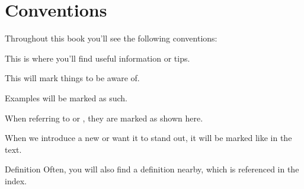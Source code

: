 % 

\section{Conventions}

Throughout this book you'll see the following conventions:

\begin{info}
This is where you'll find useful information or tips.
\end{info}

\begin{warning}
This will mark things to be aware of.
\end{warning}

\begin{example}
Examples will be marked as such.
\end{example}

When referring to  or , they are marked as shown here.

When we introduce a new  or want it to stand out, it will be marked like  in the text.  

\begin{definition}{Definition}
Often, you will also find a definition nearby, which is referenced in the index.
\end{definition}
